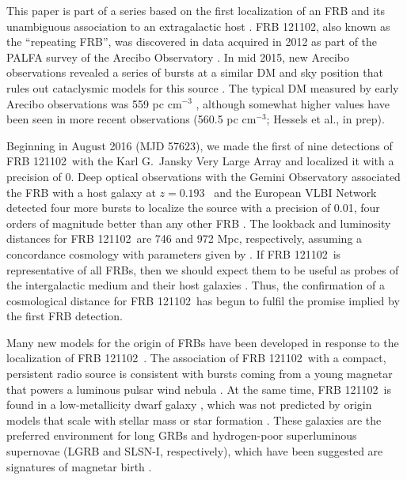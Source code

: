 \documentclass[twocolumn]{aastex61}
\newcommand{\frb}{FRB 121102}
\begin{document}
This paper is part of a series based on the first localization of an FRB and its unambiguous association to an extragalactic host \citep{LOC, OPT, EVN}. \frb, also known as the ``repeating FRB'', was discovered \citep{2014ApJ...790..101S} in data acquired in 2012 as part of the PALFA survey of the Arecibo Observatory \citep{2006ApJ...637..446C, 2015ApJ...812...81L}. In mid 2015, new Arecibo observations revealed a series of bursts at a similar DM and sky position that rules out cataclysmic models for this source \citep{2016Natur.531..202S}. The typical DM measured by early Arecibo observations was 559 pc cm$^{-3}$ \citep{2016arXiv160308880S}, although somewhat higher values have been seen in more recent observations (560.5 pc cm$^{-3}$; Hessels et al., in prep).

Beginning in August 2016 (MJD 57623), we made the first of nine detections of \frb\ with the Karl G.\ Jansky Very Large Array \citep[VLA;][]{LOC} and localized it with a precision of 0. Deep optical observations with the Gemini Observatory associated the FRB with a host galaxy at $z=0.193$\ \citep{OPT} and the European VLBI Network detected four more bursts to localize the source with a precision of 0.01\arcsec, four orders of magnitude better than any other FRB \citep[precision of $\sim40$\ pc in linear distance;][]{EVN}. The lookback and luminosity distances for \frb\ are 746 and 972 Mpc, respectively, assuming a concordance cosmology with parameters given by \citet{2016A&A...594A..13P}. If \frb\ is representative of all FRBs, then we should expect them to be useful as probes of the intergalactic medium and their host galaxies \citep{2015MNRAS.451.3278M}. Thus, the confirmation of a cosmological distance for \frb\ has begun to fulfil the promise implied by the first FRB detection.

Many new models for the origin of FRBs have been developed in response to the localization of \frb\ \citep{2017arXiv170104815K, 2017arXiv170102370M, 2017arXiv170104094Z, 2017arXiv170102492D, 2017arXiv170208644B, 2017arXiv170300393T}. The association of \frb\ with a compact, persistent radio source is consistent with bursts coming from a young magnetar that powers a luminous pulsar wind nebula \citep{2017arXiv170104815K}. At the same time, \frb\ is found in a low-metallicity dwarf galaxy \citep{OPT}, which was not predicted by origin models that scale with stellar mass or star formation \citep{2017arXiv170400022N}. These galaxies are the preferred environment for long GRBs and hydrogen-poor superluminous supernovae (LGRB and SLSN-I, respectively), which have been suggested are signatures of magnetar birth \citep{2008AJ....135.1136M, 2014ApJ...787..138L}.
\end{document}
